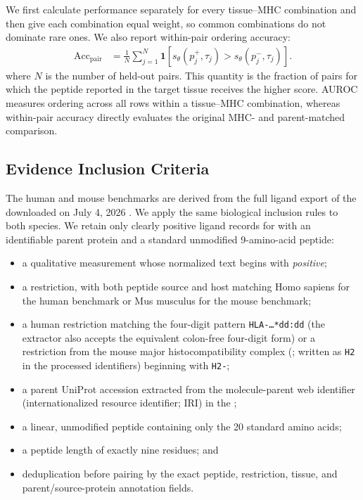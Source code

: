 We first calculate performance separately for every tissue--MHC combination and then give each combination equal weight, so common combinations do not dominate rare ones. We also report within-pair ordering accuracy:
\[
\begin{aligned}
    \operatorname{Acc}_{\mathrm{pair}}
&=
\frac{1}{N}\sum_{j=1}^{N}
\mathbf{1}\!\left[
s_{\theta}(p_j^{+},\tau_j)
>
s_{\theta}(p_j^{-},\tau_j)
\right].
\end{aligned}
\]
where \(N\) is the number of held-out pairs. This quantity is the fraction of pairs for which the peptide reported in the target tissue receives the higher score. AUROC measures ordering across all rows within a tissue--MHC combination, whereas within-pair accuracy directly evaluates the original MHC- and parent-matched comparison.

\subsection{Evidence Inclusion Criteria}

The human and mouse benchmarks are derived from the full ligand export of the \plainIEDB{} downloaded on July 4, 2026 \cite{vita2025iedb}. We apply the same biological inclusion rules to both species. We retain only clearly positive ligand records for \plainMHCI{} with an identifiable parent protein and a standard unmodified 9-amino-acid peptide:

\begin{itemize}
    \item a qualitative measurement whose normalized text begins with \emph{positive};
    \item a \plainMHCI{} restriction, with both peptide source and host matching Homo sapiens for the human benchmark or Mus musculus for the mouse benchmark;
    \item a human restriction matching the four-digit \plainHLA{} pattern \texttt{HLA-\ldots{}*dd:dd} (the extractor also accepts the equivalent colon-free four-digit form) or a restriction from the mouse major histocompatibility complex (\plainHtwo{}; written as \texttt{H2} in the processed identifiers) beginning with \texttt{H2-};
    \item a parent UniProt accession extracted from the molecule-parent web identifier (internationalized resource identifier; IRI) in the \plainIEDB{};
    \item a linear, unmodified peptide containing only the 20 standard amino acids;
    \item a peptide length of exactly nine residues; and
    \item deduplication before pairing by the exact peptide, restriction, tissue, and parent/source-protein annotation fields.
\end{itemize}

